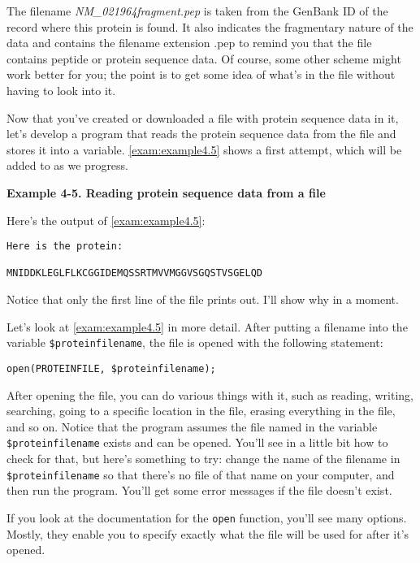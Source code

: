 The filename \textit{NM\_021964fragment.pep} is taken from the GenBank ID of the record where this protein is found. It also indicates the fragmentary nature of the data and contains the filename extension .pep to remind you that the file contains peptide or protein sequence data. Of course, some other scheme might work better for you; the point is to get some idea of what's in the file without having to look into it.

Now that you've created or downloaded a file with protein sequence data in it, let's develop a program that reads the protein sequence data from the file and stores it into a variable. \autoref{exam:example4.5} shows a first attempt, which will be added to as we progress.

\textbf{Example 4-5. Reading protein sequence data from a file}



Here's the output of \autoref{exam:example4.5}:

\begin{lstlisting}
Here is the protein:

MNIDDKLEGLFLKCGGIDEMQSSRTMVVMGGVSGQSTVSGELQD
\end{lstlisting}

Notice that only the first line of the file prints out. I'll show why in a moment.

Let's look at \autoref{exam:example4.5} in more detail. After putting a filename into the variable \verb|$proteinfilename|, the file is opened with the following statement:

\begin{lstlisting}
open(PROTEINFILE, $proteinfilename);
\end{lstlisting}

After opening the file, you can do various things with it, such as reading, writing, searching, going to a specific location in the file, erasing everything in the file, and so on. Notice that the program assumes the file named in the variable \verb|$proteinfilename| exists and can be opened. You'll see in a little bit how to check for that, but here's something to try: change the name of the filename in \verb|$proteinfilename| so that there's no file of that name on your computer, and then run the program. You'll get some error messages if the file doesn't exist.

If you look at the documentation for the \verb|open| function, you'll see many options. Mostly, they enable you to specify exactly what the file will be used for after it's opened.

